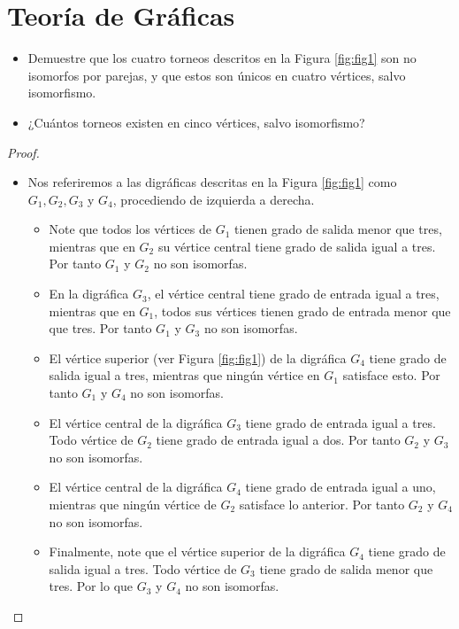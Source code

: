 \documentclass[12pt]{article}
\newenvironment{problem}[2][Problema]{\begin{trivlist}
\item[\hskip \labelsep {\bfseries #1}\hskip \labelsep {\bfseries #2.}]}{\end{trivlist}}
\begin{document}
\section*{Teoría de Gráficas}


\begin{problem}{1.5.3} \text{ } 
\begin{itemize}
    \item[a)] Demuestre que los cuatro torneos descritos en la Figura \ref{fig:fig1} son no isomorfos por parejas, y que estos son únicos en cuatro vértices, salvo isomorfismo.
    \item[b)] ¿Cuántos torneos existen en cinco vértices, salvo isomorfismo?
\end{itemize}
\end{problem}
\begin{proof}\text{}
\begin{itemize}
    \item[a)] Nos referiremos a las digráficas descritas en la Figura \ref{fig:fig1} como $G_1, G_2, G_3$ y $G_4$, procediendo de izquierda a derecha.
    \begin{itemize}
        \item Note que todos los vértices de $G_1$ tienen grado de salida menor que tres, mientras que en $G_2$ su vértice central tiene grado de salida igual a tres. Por tanto $G_1$ y $G_2$ no son isomorfas. 
        \item En la digráfica $G_3$, el vértice central tiene grado de entrada igual a tres, mientras que en $G_1$, todos sus vértices tienen grado de entrada menor que que tres. Por tanto $G_1$ y $G_3$ no son isomorfas.
        \item El vértice superior (ver Figura \ref{fig:fig1}) de la digráfica $G_4$ tiene grado de salida igual a tres, mientras que ningún vértice en $G_1$ satisface esto. Por tanto $G_1$ y $G_4$ no son isomorfas.
        \item El vértice central de la digráfica $G_3$ tiene grado de entrada igual a tres. Todo vértice de $G_2$ tiene grado de entrada igual a dos. Por tanto $G_2$ y $G_3$ no son isomorfas.
        \item El vértice central de la digráfica $G_4$ tiene grado de entrada igual a uno, mientras que ningún vértice de $G_2$ satisface lo anterior. Por tanto $G_2$ y $G_4$ no son isomorfas. 
        \item Finalmente, note que el vértice superior de la digráfica $G_4$ tiene grado de salida igual a tres. Todo vértice de $G_3$ tiene grado de salida menor que tres. Por lo que $G_3$ y $G_4$ no son isomorfas.
    \end{itemize}
    

\end{itemize}
\end{proof}
\end{document}
